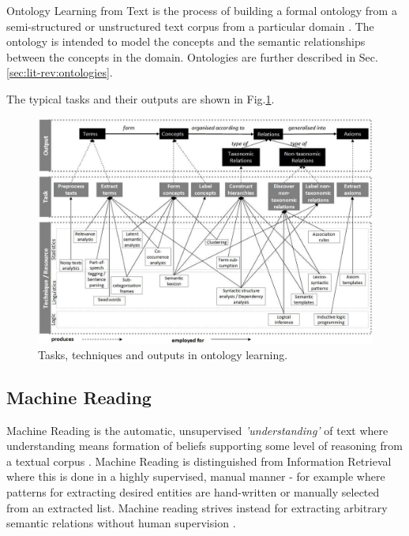 \documentclass[a4paper]{report}
\begin{document}
Ontology Learning from Text is the process of building a formal ontology from a semi-structured or unstructured text corpus from a particular domain \citep[p.3-7]{Cimiano06}.
The ontology is intended to model the concepts and the semantic relationships between the concepts in the domain.
Ontologies are further described in Sec.\ref{sec:lit-rev:ontologies}.

The typical tasks and their outputs are shown in Fig.\ref{fig:output-task-technique}.

\begin{figure}
  \includegraphics[width=\textwidth]{graphics/output-task-technique-WongLiuBennamoun.png}
  \caption{Tasks, techniques and outputs in ontology learning. \cite{Wong2009PhD}}
  \label{fig:output-task-technique}
\end{figure}


\subsection{Machine Reading}

Machine Reading is the automatic, unsupervised \emph{'understanding'} of text where understanding means formation of beliefs supporting some level of reasoning from a textual corpus \citep{EtzioniEtAll06MachineReading}.
Machine Reading is distinguished from Information Retrieval where this is done in a highly supervised, manual manner - for example where patterns for extracting desired entities are hand-written or manually selected from an extracted list.
Machine reading strives instead for extracting arbitrary semantic relations without human supervision \citep{EtzioniEtAll06MachineReading}.
\end{document}
